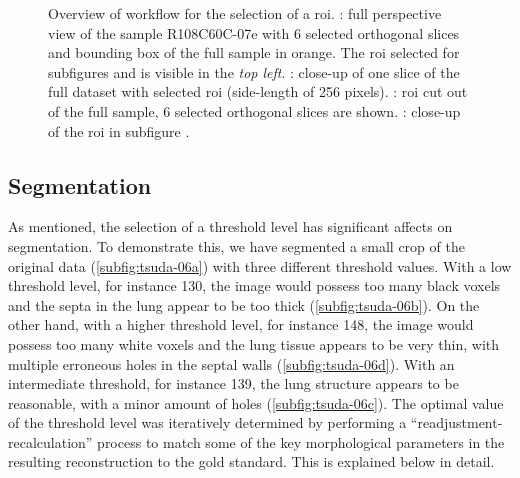 \begin{figure}
{{			\label{subfig:tsuda-05d}%
		}%
	}%
	\caption[Overview of workflow for the selection of a region of interest]{Overview of workflow for the selection of a \acf{roi}. : full perspective view of the sample R108C60C-07e with 6 selected orthogonal slices and bounding box of the full sample in orange. The \ac{roi} selected for subfigures  and  is visible in the \textit{top left}. : close-up of one slice of the full dataset with selected \ac{roi} (side-length of 256 pixels). : \ac{roi} cut out of the full sample, 6 selected orthogonal slices are shown. : close-up of the \ac{roi} in subfigure .}
	\label{fig:tsuda-05}
\end{figure}

\subsection{Segmentation}
As mentioned, the selection of a threshold level has significant affects on segmentation. To demonstrate this, we have segmented a small crop of the original data (\autoref{subfig:tsuda-06a}) with three different threshold values. With a low threshold level, for instance 130, the image would possess too many black voxels and the septa in the lung appear to be too thick (\autoref{subfig:tsuda-06b}). On the other hand, with a higher threshold level, for instance 148, the image would possess too many white voxels and the lung tissue appears to be very thin, with multiple erroneous holes in the septal walls (\autoref{subfig:tsuda-06d}). With an intermediate threshold, for instance 139, the lung structure appears to be reasonable, with a minor amount of holes (\autoref{subfig:tsuda-06c}). The optimal value of the threshold level was iteratively determined by performing a ``readjustment-recalculation'' process to match some of the key morphological parameters in the resulting \threed reconstruction to the gold standard. This is explained below in detail.

